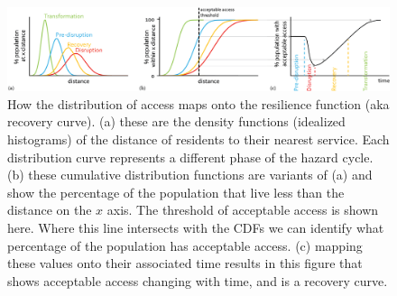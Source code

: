 \documentclass[9pt,twoside,lineno]{pnas-new}
\begin{document}
\begin{figure}[h]
    \centering
    \includegraphics[width=\linewidth]{report/fig/dist_to_resil.png}
    \caption{
    How the distribution of access maps onto the resilience function (aka recovery curve). (a) these are the density functions (idealized histograms) of the distance of residents to their nearest service.
    Each distribution curve represents a different phase of the hazard cycle. 
    (b) these cumulative distribution functions are variants of (a) and show the percentage of the population that live less than the distance on the $x$ axis.
    The threshold of acceptable access is shown here. Where this line intersects with the CDFs we can identify what percentage of the population has acceptable access.
    (c) mapping these values onto their associated time results in this figure that shows acceptable access changing with time, and is a recovery curve.
    }
    \label{figS:cdf_to_res}
\end{figure}


\end{document}
